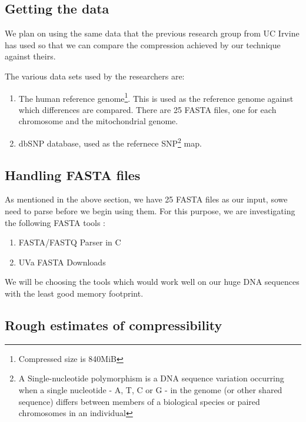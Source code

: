 \documentclass[11pt,twocolumn]{article}
\begin{document}
\subsection*{Getting the data}

We plan on using the same data that the previous research group from
UC Irvine has used so that we can compare the compression achieved by
our technique against theirs.

The various data sets used by the researchers are:

\begin{enumerate}

\item The human reference genome\footnote{Compressed size is
  840MiB}. This is used as the reference genome against which
  differences are compared. There are 25 FASTA files, one for each
  chromosome and the mitochondrial genome.

\item dbSNP database, used as the refernece SNP\footnote{A
  Single-nucleotide polymorphism is a DNA sequence variation occurring
  when a single nucleotide - A, T, C or G - in the genome (or other
  shared sequence) differs between members of a biological species or
  paired chromosomes in an individual} map.


\end{enumerate}


\subsection*{Handling FASTA files}
As mentioned in the above section, we have 25 FASTA files as 
our input, sowe need to parse before we begin using them. 
For this purpose, we are investigating the following FASTA tools :
\begin{enumerate}
\item FASTA/FASTQ Parser in C\cite{7}
\item UVa FASTA Downloads\cite{8}
\end{enumerate}

We will be choosing the tools which would work well on our huge 
DNA sequences with the least good memory footprint. 

\subsection*{Rough estimates of compressibility}

\clearpage
\end{document}
